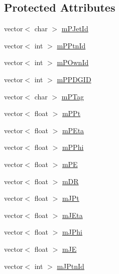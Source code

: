 \subsection*{Protected Attributes}
\begin{DoxyCompactItemize}
\item 
vector$<$ char $>$ \hyperlink{class_herwig_1_1_herwig_tree_a2959f5c6970dffaa74eeb606c650b04f}{m\+P\+Jet\+Id}
\item 
vector$<$ int $>$ \hyperlink{class_herwig_1_1_herwig_tree_a7dfcff3430486ec5f022b2ecce0ee62f}{m\+P\+Ptn\+Id}
\item 
vector$<$ int $>$ \hyperlink{class_herwig_1_1_herwig_tree_a11a7a3ded9e4268d2a1152e48de1c761}{m\+P\+Own\+Id}
\item 
vector$<$ int $>$ \hyperlink{class_herwig_1_1_herwig_tree_ac0b628d7f65f0dd5282a6f37ed75cd62}{m\+P\+P\+D\+G\+ID}
\item 
vector$<$ char $>$ \hyperlink{class_herwig_1_1_herwig_tree_ad3e9614afd7e68fee47bc102067d3a15}{m\+P\+Tag}
\item 
vector$<$ float $>$ \hyperlink{class_herwig_1_1_herwig_tree_a7097209613587b2065e46044fe3e0dcf}{m\+P\+Pt}
\item 
vector$<$ float $>$ \hyperlink{class_herwig_1_1_herwig_tree_ab79e875b02024eb96d625b32a9e8943e}{m\+P\+Eta}
\item 
vector$<$ float $>$ \hyperlink{class_herwig_1_1_herwig_tree_afd0e29eb67ff06d6325fc5773bcb7d96}{m\+P\+Phi}
\item 
vector$<$ float $>$ \hyperlink{class_herwig_1_1_herwig_tree_a1e002df7309a0a1cb10eae3b807e2d33}{m\+PE}
\item 
vector$<$ float $>$ \hyperlink{class_herwig_1_1_herwig_tree_a68f88a82fd213cbe59b51c019f5773d1}{m\+DR}
\item 
vector$<$ float $>$ \hyperlink{class_herwig_1_1_herwig_tree_ae26408eb10df0fc5643022ea718b73ba}{m\+J\+Pt}
\item 
vector$<$ float $>$ \hyperlink{class_herwig_1_1_herwig_tree_a50b89cfc9ac1d0a0d210483ec0b33584}{m\+J\+Eta}
\item 
vector$<$ float $>$ \hyperlink{class_herwig_1_1_herwig_tree_ae5fb619ee4d7c58f7f6d71d99392dd5b}{m\+J\+Phi}
\item 
vector$<$ float $>$ \hyperlink{class_herwig_1_1_herwig_tree_a49f4d5832d02c8e2e317ffb11c4f4f98}{m\+JE}
\item 
vector$<$ int $>$ \hyperlink{class_herwig_1_1_herwig_tree_aae0a968baf348f5b1b34c0eae9225042}{m\+J\+Ptn\+Id}
\item 

\end{DoxyCompactItemize}
